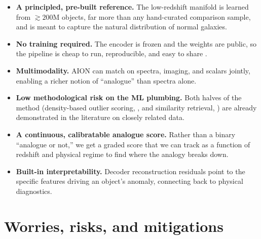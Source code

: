 \documentclass[onecolumn,astrosymb,tighten,longbib,trackchanges]{aastex7} %
\newcommand{\aion}{\textsc{AION}\xspace}
\begin{document}
\begin{itemize}
  \item \textbf{A principled, pre-built reference.} The low-redshift manifold is learned from
        $\gtrsim\!200$M objects, far more than any hand-curated comparison sample, and is meant to
        capture the natural distribution of normal galaxies.
  \item \textbf{No training required.} The encoder is frozen and the weights are public, so the
        pipeline is cheap to run, reproducible, and easy to share \citep{Parker2025_AION_omnimodal}.
  \item \textbf{Multimodality.} \aion can match on spectra, imaging, and scalars jointly, enabling a
        richer notion of ``analogue'' than spectra alone.
  \item \textbf{Low methodological risk on the ML plumbing.} Both halves of the method
        (density-based outlier scoring, \citealt{Liang2023_outlier_detection}, and similarity
        retrieval, \citealt{Parker2025_AION_omnimodal}) are already demonstrated in the literature on
        closely related data.
  \item \textbf{A continuous, calibratable analogue score.} Rather than a binary ``analogue or
        not,'' we get a graded score that we can track as a function of redshift and physical
        regime to find where the analogy breaks down.
  \item \textbf{Built-in interpretability.} Decoder reconstruction residuals point to the specific
        features driving an object's anomaly, connecting back to physical diagnostics.
\end{itemize}


\section{Worries, risks, and mitigations} \label{sec:worries}
\end{document}
